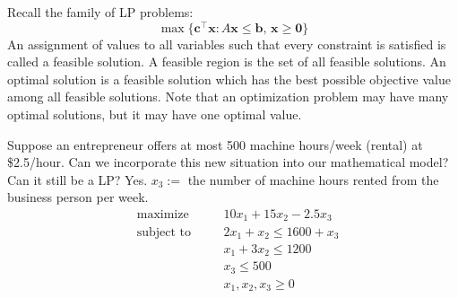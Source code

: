 Recall the family of LP problems:
\[\max \{\bm{c}^\top \bm{x} : A\bm{x}\leqslant \bm{b},\,\bm{x}\geqslant  \bm{0}\} \]
An assignment of values to all variables such that every
constraint is satisfied is called a feasible solution.
A feasible region is the set of all feasible solutions.
An optimal solution is a feasible solution which has the best
possible objective value among all feasible solutions.
Note that an optimization problem may have many optimal
solutions, but it may have one optimal value.

\begin{exbox}
    \begin{example}
        Suppose an entrepreneur offers at most 500 machine hours/week
        (rental) at \$2.5/hour. Can we incorporate this new situation
        into our mathematical model? Can it still be a LP? Yes.
        $x_3:=$ the number of machine hours rented from the business
        person per week.
        \begin{equation}
            \begin{aligned}
                 & \text{maximize}   & \quad & 10x_1+15x_2-2.5x_3         \\
                 & \text{subject to} &       & 2x_1+x_2\leqslant 1600+x_3 \\
                 &                   &       & x_1+3x_2\leqslant 1200     \\
                 &                   &       & x_3\leqslant 500           \\
                 &                   &       & x_1,x_2,x_3\geqslant  0    \\
            \end{aligned}\tag{LP}
        \end{equation}
    \end{example}
\end{exbox}
